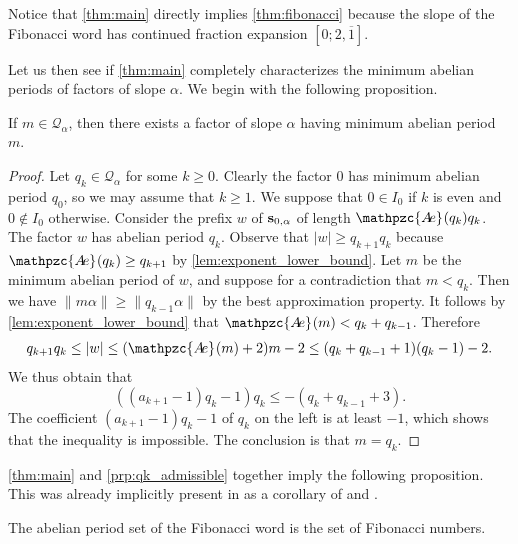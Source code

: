 \documentclass[a4paper,fleqn]{article}
\providecommand{\abs}[1]{\lvert#1\rvert}
\providecommand{\norm}[1]{\lVert#1\rVert}
\newcommand{\infw}[1]{%
  \ifcat\noexpand#1\relax\bm{#1}%
  \else\mathbf{#1}\fi}          %
\newcommand{\abexp}[2][]{\mathpzc{A\mkern-3mu e}_{#1}(#2)}
\newcommand{\qk}[1]{\mathcal{Q}_{#1}}
\begin{document}
  Notice that \autoref{thm:main} directly implies \autoref{thm:fibonacci} because the slope of the Fibonacci word has
  continued fraction expansion $[0; 2, \overline{1}]$.

  Let us then see if \autoref{thm:main} completely characterizes the minimum abelian periods of factors of slope
  $\alpha$. We begin with the following proposition.

  \begin{proposition}\label{prp:qk_admissible}
    If $m \in \qk{\alpha}$, then there exists a factor of slope $\alpha$ having minimum abelian period $m$.
  \end{proposition}
  \begin{proof}
    Let $q_k \in \qk{\alpha}$ for some $k \geq 0$. Clearly the factor $0$ has minimum abelian period $q_0$, so we may
    assume that $k \geq 1$. We suppose that $0 \in I_0$ if $k$ is even and $0 \notin I_0$ otherwise. Consider the
    prefix $w$ of $\infw{s}_{0,\alpha}$ of length $\abexp{q_k}q_k$. The factor $w$ has abelian period $q_k$. Observe
    that $\abs{w} \geq q_{k+1} q_k$ because $\abexp{q_k} \geq q_{k+1}$ by \autoref{lem:exponent_lower_bound}. Let $m$
    be the minimum abelian period of $w$, and suppose for a contradiction that $m < q_k$. Then we have
    $\norm{m\alpha} \geq \norm{q_{k-1}\alpha}$ by the best approximation property. It follows by
    \autoref{lem:exponent_lower_bound} that $\abexp{m} < q_k + q_{k-1}$. Therefore
    \begin{equation*}
      q_{k+1} q_k \leq \abs{w} \leq (\abexp{m} + 2)m - 2 \leq (q_k + q_{k-1} + 1)(q_k - 1) - 2.
    \end{equation*}
    We thus obtain that
    \begin{equation*}
      ((a_{k+1} - 1)q_k - 1)q_k \leq -(q_k + q_{k-1} + 3).
    \end{equation*}
    The coefficient $(a_{k+1} - 1)q_k - 1$ of $q_k$ on the left is at least $-1$, which shows that the inequality is
    impossible. The conclusion is that $m = q_k$.
  \end{proof}

  \autoref{thm:main} and \autoref{prp:qk_admissible} together imply the following proposition. This was already
  implicitly present in \cite{2016:abelian_powers_and_repetitions_in_sturmian_words} as a corollary of
  \cite[Thm.~6.9]{2016:abelian_powers_and_repetitions_in_sturmian_words} and
  \cite[Thm.~6.12]{2016:abelian_powers_and_repetitions_in_sturmian_words}.

  \begin{proposition}
    The abelian period set of the Fibonacci word is the set of Fibonacci numbers.
  \end{proposition}
\end{document}
